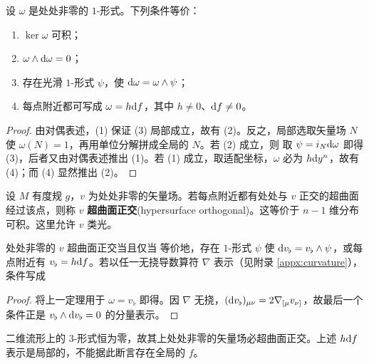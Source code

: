 \begin{theorem}[余维为一的情形]
    设 $\omega$ 是处处非零的 $1$-形式。下列条件等价：
    \begin{enumerate}
        \item $\ker\omega$ 可积；
        \item $\omega\wedge\dd\omega=0$；
        \item 存在光滑 $1$-形式 $\psi$，使 $\dd\omega=\omega\wedge\psi$；
        \item 每点附近都可写成 $\omega=h\dd f$，其中 $h\ne0$、$\dd f\ne0$。
    \end{enumerate}
\end{theorem}
\begin{proof}
    由对偶表述，(1) 保证 (3) 局部成立，故有 (2)。反之，局部选取矢量场 $N$ 使 $\omega(N)=1$，再用单位分解拼成全局的 $N$。若 (2) 成立，则
    取 $\psi=i_N\dd\omega$ 即得 (3)，后者又由对偶表述推出 (1)。若 (1) 成立，取适配坐标，$\omega$ 必为 $h\dd y^n$，故有 (4)；而 (4) 显然推出 (2)。
\end{proof}

\begin{definition}
    设 $M$ 有度规 $g$，$v$ 为处处非零的矢量场。若每点附近都有处处与 $v$ 正交的超曲面经过该点，则称 $v$ \textbf{超曲面正交}(hypersurface orthogonal)。这等价于 $n-1$ 维分布
    可积。这里允许 $v$ 类光。
\end{definition}

\begin{theorem}[超曲面正交的充要条件]
    处处非零的 $v$ 超曲面正交当且仅当
    等价地，存在 $1$-形式 $\psi$ 使 $\dd v_\flat=v_\flat\wedge\psi$，或每点附近有 $v_\flat=h\dd f$。若以任一无挠导数算符 $\nabla$ 表示（见附录 \ref{appx:curvature}），条件写成
\end{theorem}
\begin{proof}
    将上一定理用于 $\omega=v_\flat$ 即得。因 $\nabla$ 无挠，$(\dd v_\flat)_{\mu\nu}=2\nabla_{[\mu}v_{\nu]}$，故最后一个条件正是 $v_\flat\wedge\dd v_\flat=0$ 的分量表示。
\end{proof}

\begin{remark}
    二维流形上的 $3$-形式恒为零，故其上处处非零的矢量场必超曲面正交。上述 $h\dd f$ 表示是局部的，不能据此断言存在全局的 $f$。
\end{remark}

